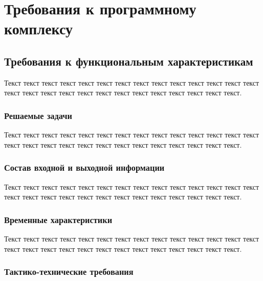 \newpage\section{Требования к программному комплексу}\label{section:Требования к программному комплексу}

\subsection{Требования к функциональным характеристикам}

Текст текст текст текст текст текст текст текст текст текст текст текст текст текст текст текст текст текст текст текст текст текст текст текст текст текст текст.

\subsubsection{Решаемые задачи}

Текст текст текст текст текст текст текст текст текст текст текст текст текст текст текст текст текст текст текст текст текст текст текст текст текст текст текст.

\subsubsection{Состав входной и выходной информации}

Текст текст текст текст текст текст текст текст текст текст текст текст текст текст текст текст текст текст текст текст текст текст текст текст текст текст текст.

\subsubsection{Временные характеристики}

Текст текст текст текст текст текст текст текст текст текст текст текст текст текст текст текст текст текст текст текст текст текст текст текст текст текст текст.

\subsubsection{Тактико-технические требования}

